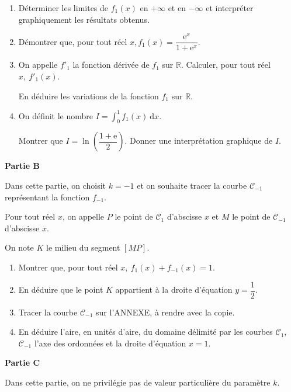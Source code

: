 \documentclass[10pt]{article}
\newcommand{\R}{\mathbb{R}}
\begin{document}
\begin{enumerate}
\item Déterminer les limites de $f_{1}(x)$ en $+ \infty$ et en $- \infty$ et interpréter graphiquement les résultats obtenus. 
\item Démontrer que, pour tout réel $x, f_{1}(x) = \dfrac{\text{e}^{x}}{1 +  \text{e}^{x}}$. 
\item On appelle $f'_{1}$ la fonction dérivée de $f_{1}$ sur $\R$. Calculer, pour tout réel $x,\: f'_{1}(x)$. 

En déduire les variations de la fonction $f_{1}$ sur $\R$. 
\item On définit le nombre $I = \displaystyle\int_{0}^1  f_{1}(x)\:\text{d}x$. 

Montrer que $I = \ln \left(\dfrac{1 + \text{e}}{2}\right)$. Donner une interprétation graphique de $I$.
\end{enumerate}
 
\bigskip
 
\textbf{Partie B}

\medskip
 
Dans cette partie, on choisit $k = - 1$ et on souhaite tracer la courbe $\mathcal{C}_{- 1}$ représentant la fonction $f_{- 1}$. 

Pour tout réel $x$, on appelle $P$ le point de $\mathcal{C}_{1}$ d'abscisse $x$ et $M $ le point de $\mathcal{C}_{- 1}$ d'abscisse $x$.
 
On note $K$ le milieu du segment $[MP]$.

\medskip
 
\begin{enumerate}
\item Montrer que, pour tout réel $x,\: f_{1}(x) + f_{- 1}(x) = 1$. 
\item En déduire que le point $K$ appartient à la droite d'équation $y = \dfrac{1}{2}$. 
\item Tracer la courbe $\mathcal{C}_{- 1}$ sur l'ANNEXE, à rendre avec la copie. 
\item En déduire l'aire, en unités d'aire, du domaine délimité par les courbes $\mathcal{C}_{1}$, $\mathcal{C}_{- 1}$ l'axe des ordonnées et la droite d'équation $x = 1$. 
\end{enumerate}

\bigskip
 
\textbf{Partie C}

\medskip
 
Dans cette partie, on ne privilégie pas de valeur particulière du paramètre $k$.
 
\end{document}

